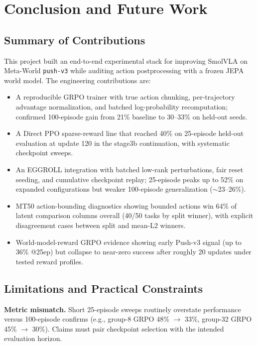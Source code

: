 \chapter{Conclusion and Future Work}

\section{Summary of Contributions}
\label{sec:summary-contributions}

This project built an end-to-end experimental stack for improving SmolVLA on Meta-World \texttt{push-v3} while auditing action postprocessing with a frozen JEPA world model. The engineering contributions are:
\begin{itemize}
  \item A reproducible GRPO trainer with true action chunking, per-trajectory advantage normalization, and batched log-probability recomputation; confirmed 100-episode gain from 21\% baseline to 30--33\% on held-out seeds.
  \item A Direct PPO sparse-reward line that reached 40\% on 25-episode held-out evaluation at update 120 in the stage3b continuation, with systematic checkpoint sweeps.
  \item An EGGROLL integration with batched low-rank perturbations, fair reset seeding, and cumulative checkpoint replay; 25-episode peaks up to 52\% on expanded configurations but weaker 100-episode generalization ($\sim$23--26\%).
  \item MT50 action-bounding diagnostics showing bounded actions win 64\% of latent comparison columns overall (40/50 tasks by split winner), with explicit disagreement cases between split and mean-L2 winners.
  \item World-model-reward GRPO evidence showing early Push-v3 signal (up to 36\% @25ep) but collapse to near-zero success after roughly 20 updates under tested reward profiles.
\end{itemize}

\section{Limitations and Practical Constraints}
\label{sec:limitations}

\textbf{Metric mismatch.} Short 25-episode sweeps routinely overstate performance versus 100-episode confirms (e.g., group-8 GRPO 48\% $\rightarrow$ 33\%, group-32 GRPO 45\% $\rightarrow$ 30\%). Claims must pair checkpoint selection with the intended evaluation horizon.

